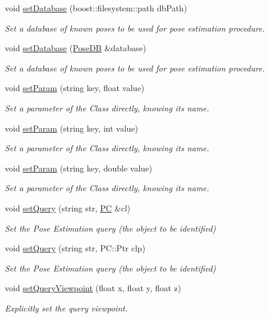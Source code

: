 \begin{DoxyCompactItemize}
void \hyperlink{classPoseEstimation_a0ace84f98f2bab31e64ffaa4eefdf402}{set\-Database} (boost\-::filesystem\-::path db\-Path)
\begin{DoxyCompactList}\small\item\em Set a database of known poses to be used for pose estimation procedure. \end{DoxyCompactList}\item 
void \hyperlink{classPoseEstimation_ad4874b54c2fa79dfdb322d60470754cc}{set\-Database} (\hyperlink{classPoseDB}{Pose\-D\-B} \&database)
\begin{DoxyCompactList}\small\item\em Set a database of known poses to be used for pose estimation procedure. \end{DoxyCompactList}\item 
void \hyperlink{classPoseEstimation_ae416bbbfdefdb60a6f82a9b255edc124}{set\-Param} (string key, float value)
\begin{DoxyCompactList}\small\item\em Set a parameter of the Class directly, knowing its name. \end{DoxyCompactList}\item 
void \hyperlink{classPoseEstimation_a1d768a589eb6424d936afb9f15d28067}{set\-Param} (string key, int value)
\begin{DoxyCompactList}\small\item\em Set a parameter of the Class directly, knowing its name. \end{DoxyCompactList}\item 
void \hyperlink{classPoseEstimation_ae1902de07546dd5a2b4ffbbd08fed7b2}{set\-Param} (string key, double value)
\begin{DoxyCompactList}\small\item\em Set a parameter of the Class directly, knowing its name. \end{DoxyCompactList}\item 
void \hyperlink{classPoseEstimation_a8c3e730167d42d2d8cfd4a08389d17ce}{set\-Query} (string str, \hyperlink{group__Definitions_ga62eb21fcfa3189c5de50fb62a2a7a79e}{P\-C} \&cl)
\begin{DoxyCompactList}\small\item\em Set the Pose Estimation query (the object to be identified) \end{DoxyCompactList}\item 
void \hyperlink{classPoseEstimation_a0abb4e19ca862ef280f8d76ed2f9bac7}{set\-Query} (string str, P\-C\-::\-Ptr clp)
\begin{DoxyCompactList}\small\item\em Set the Pose Estimation query (the object to be identified) \end{DoxyCompactList}\item 
void \hyperlink{classPoseEstimation_a378321aa07ca329332f20ba8bf6ffaad}{set\-Query\-Viewpoint} (float x, float y, float z)
\begin{DoxyCompactList}\small\item\em Explicitly set the query viewpoint. \end{DoxyCompactList}\end{DoxyCompactItemize}
